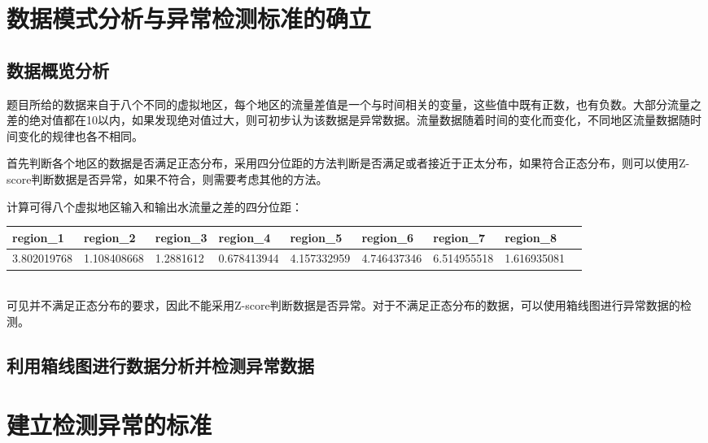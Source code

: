 \documentclass[UTF8]{article}
\begin{document}
	\section{数据模式分析与异常检测标准的确立}	
	\subsection{数据概览分析}
		\par 题目所给的数据来自于八个不同的虚拟地区，每个地区的流量差值是一个与时间相关的变量，这些值中既有正数，也有负数。大部分流量之差的绝对值都在10以内，如果发现绝对值过大，则可初步认为该数据是异常数据。流量数据随着时间的变化而变化，不同地区流量数据随时间变化的规律也各不相同。
		\par 首先判断各个地区的数据是否满足正态分布，采用四分位距的方法判断是否满足或者接近于正太分布，如果符合正态分布，则可以使用Z-score判断数据是否异常，如果不符合，则需要考虑其他的方法。
		\par 计算可得八个虚拟地区输入和输出水流量之差的四分位距：
		\begin{table}[!ht]
    \centering
	\resizebox{0.8\textwidth}{!}
	{
    \begin{tabular}{|l|l|l|l|l|l|l|l|l|}
    \hline
        region\_1 & region\_2 & region\_3 & region\_4 & region\_5 & region\_6 & region\_7 & region\_8 \\ \hline
        3.802019768 & 1.108408668 & 1.2881612 & 0.678413944 & 4.157332959 & 4.746437346 & 6.514955518 & 1.616935081 \\ \hline
    \end{tabular}
	}
	\end{table}
	\\可见并不满足正态分布的要求，因此不能采用Z-score判断数据是否异常。对于不满足正态分布的数据，可以使用箱线图进行异常数据的检测。
	\subsection{利用箱线图进行数据分析并检测异常数据}

	\section{建立检测异常的标准}
	\subsection{}
\end{document}
